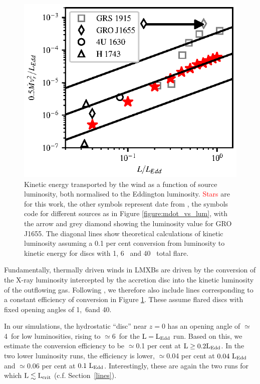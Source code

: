 \documentclass[a4paper,fleqn,usenatbib]{mnras}
\begin{document}
\begin{figure}
\includegraphics[width=\columnwidth]{figures/fig7_lum_vs_ke_ponti.eps}
\caption{Kinetic energy transported by the wind  as a function of source luminosity, both
normalised to the Eddington luminosity. \textcolor{red}{Stars} are for this work, the other symbols represent
date from
\protect\cite{2016AN....337..512P}, the symbols code for different sources as in Figure \ref{figure:mdot_vs_lum},
with the arrow and grey diamond showing the \protect\cite{2016ApJ...823..159S} luminosity
value for GRO J1655.
The diagonal lines show theoretical calculations of kinetic luminosity assuming a 0.1 per cent conversion
from luminosity to kinetic energy for discs with 1\degree, 6\degree~ and 40\degree~ total flare.}
\label{figure:ke_vs_lum}
\end{figure}

Fundamentally, thermally driven winds
in LMXBs are driven by the conversion of the X-ray luminosity
intercepted by the accretion disc into the kinetic luminosity of the
outflowing gas. Following \citep{2016AN....337..512P}, we therefore
also include lines corresponding to a
constant efficiency of conversion  in Figure \ref{figure:ke_vs_lum}. These 
assume flared discs with fixed
opening angles of 1\degree,~6\degree and 40\degree.

In our simulations, the hydrostatic ``disc'' near $z =
0$ has an opening angle of $\simeq$4\degree~for low luminosities,
rising to $\simeq$6\degree~for  the $\rm{L=L_{Edd}}$ run. Based on
this, we estimate the conversion efficiency to be 
$\simeq$0.1 per cent at $\rm{L \geq 0.2L_{Edd}}$. In the two lower
luminosity runs, the efficiency is lower, $\simeq$0.04 per cent at
$\rm{0.04~L_{Edd}}$ and $\simeq$0.06 per cent at
$\rm{0.1~L_{Edd}}$. Interestingly, these are again the two runs for
which $\rm{ L \lesssim L_{crit}}$ (c.f. Section~\ref{lines}).
\end{document}
